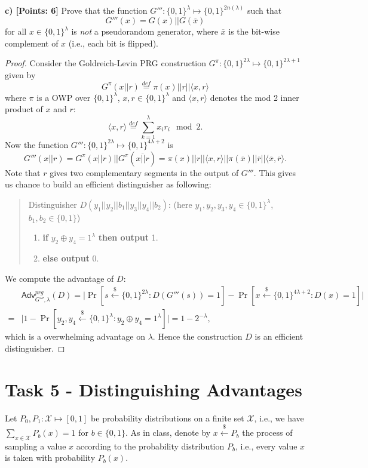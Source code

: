\documentclass[12pt]{article}
\newcommand{\eqdef}{\stackrel{def}{=}}
\newcommand{\bits}{\{0,1\}}
\newcommand{\getsr}{\stackrel{\$}{\gets}}
\newcommand{\angles}[1]{\langle #1 \rangle}
\newcommand{\Adv}{\textsf{Adv}}
\theoremstyle{definition}
\begin{document}
{\bf c) [Points: 6]} Prove that the function $G''' : \bits^{\lambda} \mapsto \bits^{2n(\lambda)}$ such that
$$G'''(x) = G(x)||G(\overline{x})$$
for all $x\in\bits^\lambda$ is \emph{not} a pseudorandom generator, where $\overline{x}$ is the bit-wise complement of $x$ (i.e., each bit is flipped).
\begin{proof}
Consider the Goldreich-Levin PRG construction $G^\pi : \bits^{2\lambda} \mapsto \bits^{2\lambda+1}$ given by
$$G^\pi(x||r) \eqdef \pi(x)||r||\angles{x,r}$$
where $\pi$ is a OWP over $\bits^\lambda$, $x,r \in \bits^\lambda$ and $\angles{x,r}$ denotes the mod 2 inner product of $x$ and $r$:
$$\angles{x,r} \eqdef \sum_{k=1}^\lambda x_ir_i\mod 2.$$
Now the function $G''' : \bits^{2\lambda} \mapsto \bits^{4\lambda+2}$ is
$$G'''(x||r) = G^\pi(x||r)||G^\pi(\overline{x||r}) = \pi(x)||r||\angles{x,r}||\pi(\overline{x})||\overline{r}||\angles{\overline{x},\overline{r}}.$$
Note that $r$ gives two complementary segments in the output of $G'''$. This gives us chance to build an efficient distinguisher as following:
\begin{quote}
Distinguisher $D(y_1||y_2||b_1||y_3||y_4||b_2)$: (here $y_1,y_2,y_3,y_4 \in \bits^\lambda$, $b_1,b_2\in\bits$)
\begin{enumerate}
\item {\bf if} $y_2 \oplus y_4 = 1^\lambda$ {\bf then output} 1.
\item {\bf else output} 0.
\end{enumerate}
\end{quote}
We compute the advantage of $D$:
$$
\begin{aligned}
&\Adv_{G''',\lambda}^{prg}(D) = \bigg| \Pr[s\getsr \bits^{2\lambda}: D(G'''(s))=1] - \Pr[x\getsr \bits^{4\lambda+2}: D(x)=1] \bigg| \\
=& \bigg| 1 - \Pr[y_2,y_4 \getsr\bits^\lambda: y_2 \oplus y_4 = 1^\lambda] \bigg| = 1 - 2^{-\lambda},
\end{aligned}
$$
which is a overwhelming advantage on $\lambda$. Hence the construction $D$ is an efficient distinguisher.
\end{proof}


\section{Task 5 - Distinguishing Advantages}
Let $P_0, P_1 : \mathcal{X} \mapsto [0,1]$ be probability distributions on a finite set $\mathcal{X}$, i.e., we have $\sum_{x\in\mathcal{X}}P_b(x) = 1$ for $b\in\bits$. As in class, denote by $x\getsr P_b$ the process of sampling a value $x$ according to the probability distribution $P_b$, i.e., every value $x$ is taken with probability $P_b(x)$.
\end{document}
